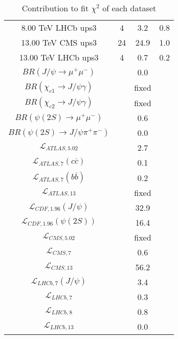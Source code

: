 \begin{table}[h!]
\begin{tabular}{c|c|c|c}
8.00 TeV LHCb ups3 & 4 & 3.2 & 0.8 \\
13.00 TeV CMS ups3 & 24 & 24.9 & 1.0 \\
13.00 TeV LHCb ups3 & 4 & 0.7 & 0.2 \\
\hline
$BR(J/\psi\rightarrow\mu^+\mu^-)$ &  & 0.0 &  \\
$BR(\chi_{c1}\rightarrow J/\psi\gamma)$ &  & fixed & \\
$BR(\chi_{c2}\rightarrow J/\psi\gamma)$ &  & fixed & \\
$BR(\psi(2S)\rightarrow\mu^+\mu^-)$ &  & 0.6 &  \\
$BR(\psi(2S)\rightarrow J/\psi\pi^+\pi^-)$ &  & 0.0 &  \\
$\mathcal L_{ATLAS,5.02}$ &  & 2.7 &  \\
$\mathcal L_{ATLAS,7}(c\overline c)$ &  & 0.1 &  \\
$\mathcal L_{ATLAS,7}(b\overline b)$ &  & 0.2 &  \\
$\mathcal L_{ATLAS,13}$ &  & fixed & \\
$\mathcal L_{CDF,1.96}(J/\psi)$ &  & 32.9 &  \\
$\mathcal L_{CDF,1.96}(\psi(2S))$ &  & 16.4 &  \\
$\mathcal L_{CMS,5.02}$ &  & fixed & \\
$\mathcal L_{CMS,7}$ &  & 0.6 &  \\
$\mathcal L_{CMS,13}$ &  & 56.2 &  \\
$\mathcal L_{LHCb,7}(J/\psi)$ &  & 3.4 &  \\
$\mathcal L_{LHCb,7}$ &  & 0.3 &  \\
$\mathcal L_{LHCb,8}$ &  & 0.8 &  \\
$\mathcal L_{LHCb,13}$ &  & 0.0 &  \\
\end{tabular}
\caption{Contribution to fit $\chi^2$ of each dataset}
\end{table}
